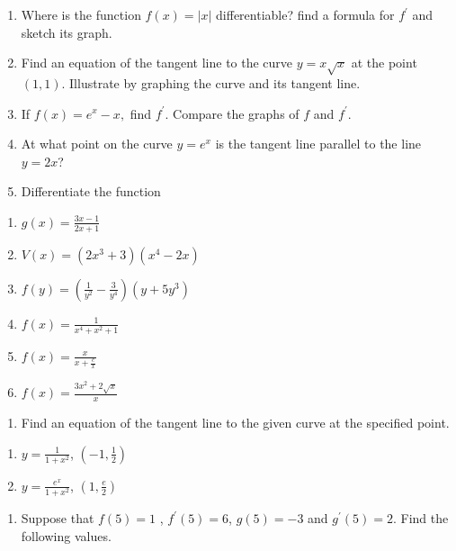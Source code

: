 \documentclass[]{book}
\providecommand{\tightlist}{%
  \setlength{\itemsep}{0pt}\setlength{\parskip}{0pt}}
\begin{document}
\begin{enumerate}
\def\labelenumi{\arabic{enumi}.}
\setcounter{enumi}{3}
\item
  Where is the function \(f(x) = |x|\) differentiable? find a formula for \(f^\prime\) and sketch its graph.
\item
  Find an equation of the tangent line to the curve \(y=x \sqrt x\) at the point \((1,1).\) Illustrate by graphing the curve and its tangent line.
\item
  If \(f(x) = e^x -x,\) find \(f^\prime\). Compare the graphs of \(f\) and \(f^\prime\).
\item
  At what point on the curve \(y=e^x\) is the tangent line parallel to the line \(y=2x\)?
\item
  Differentiate the function
\end{enumerate}

\begin{enumerate}
\def\labelenumi{(\alph{enumi})}
\tightlist
\item
  \(g(x) = \frac{3x-1}{2x+1}\)
\item
  \(V(x) = (2x^3+3)(x^4-2x)\)
\item
  \(f(y) = \left ( \frac{1}{y^2}- \frac{3}{y^4} \right ) (y+5y^3)\)
\item
  \(f(x) = \frac{1}{x^4+x^2+1}\)
\item
  \(f(x) = \frac{x}{x+\frac{c}{x}}\)
\item
  \(f(x) = \frac{3x^2+2\sqrt x}{x}\)
\end{enumerate}

\begin{enumerate}
\def\labelenumi{\arabic{enumi}.}
\setcounter{enumi}{8}
\tightlist
\item
  Find an equation of the tangent line to the given curve at the specified point.
\end{enumerate}

\begin{enumerate}
\def\labelenumi{(\alph{enumi})}
\tightlist
\item
  \(y= \frac{1}{1+x^2}\), \((-1, \frac{1}{2})\)
\item
  \(y= \frac{e^x }{1+x^2}\), \((1, \frac{e}{2})\)
\end{enumerate}

\begin{enumerate}
\def\labelenumi{\arabic{enumi}.}
\setcounter{enumi}{9}
\tightlist
\item
  Suppose that \(f(5) = 1\) , \(f^\prime (5) =6\), \(g(5) = -3\) and \(g^\prime (5) =2\). Find the following values.
\end{enumerate}
\end{document}
